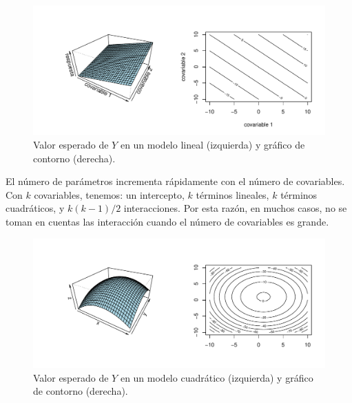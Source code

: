 \documentclass[
]{article}
\begin{document}
\begin{figure}

{\centering \includegraphics{MLG2_files/figure-latex/modPoli1-1} 

}

\caption{Valor esperado de $Y$ en un modelo lineal (izquierda) y gráfico de contorno (derecha).}\label{fig:modPoli1}
\end{figure}

El número de parámetros incrementa rápidamente con el número de covariables. Con \(k\) covariables, tenemos: un intercepto, \(k\) términos lineales, \(k\)
términos cuadráticos, y \(k(k - 1)/2\) interacciones. Por esta razón, en muchos casos, no se toman en cuentas las interacción cuando el número de covariables es grande.

\begin{figure}

{\centering \includegraphics{MLG2_files/figure-latex/modPoli2-1} 

}

\caption{Valor esperado de $Y$ en un modelo cuadrático (izquierda) y gráfico de contorno (derecha).}\label{fig:modPoli2}
\end{figure}
\end{document}
